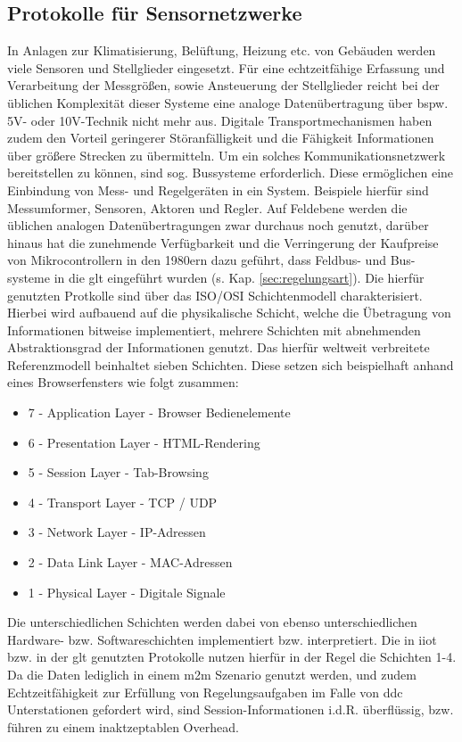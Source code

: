 \subsection{Protokolle für Sensornetzwerke}
In Anlagen zur Klimatisierung, Belüftung, Heizung etc. von Gebäuden werden viele Sensoren und Stellglieder eingesetzt. Für eine echtzeitfähige Erfassung und Verarbeitung der Messgrößen, sowie Ansteuerung der Stellglieder reicht bei der üblichen Komplexität dieser Systeme eine analoge Datenübertragung über bspw. 5V- oder 10V-Technik nicht mehr aus. Digitale Transportmechanismen haben zudem den Vorteil geringerer Störanfälligkeit und die Fähigkeit Informationen über größere Strecken zu übermitteln. \cite{gebauto}
Um ein solches Kommunikationsnetzwerk bereitstellen zu können, sind sog. Bussysteme erforderlich. Diese ermöglichen eine Einbindung von Mess- und Regelgeräten in ein System. Beispiele hierfür sind Messumformer, Sensoren, Aktoren und Regler. \cite{61158-1} \newline
Auf Feldebene werden die üblichen analogen Datenübertragungen zwar durchaus noch genutzt, darüber hinaus hat die zunehmende Verfügbarkeit und die Verringerung der Kaufpreise von Mikrocontrollern in den 1980ern dazu geführt, dass Feldbus- und Bus-systeme in die \ac{glt} eingeführt wurden (s. Kap. \ref{sec:regelungsart}).
Die hierfür genutzten Protkolle sind über das ISO/OSI Schichtenmodell charakterisiert. Hierbei wird aufbauend auf die physikalische Schicht, welche die Übetragung von Informationen bitweise implementiert, mehrere Schichten mit abnehmenden Abstraktionsgrad der Informationen genutzt. Das hierfür weltweit verbreitete Referenzmodell beinhaltet sieben Schichten. \cite{osi} Diese setzen sich beispielhaft anhand eines Browserfensters wie folgt zusammen:
\begin{itemize}
    \item 7 - Application Layer      -   Browser Bedienelemente
    \item 6 - Presentation Layer     -   HTML-Rendering
    \item 5 - Session Layer          -  Tab-Browsing
    \item 4 - Transport Layer        -   TCP / UDP
    \item 3 - Network Layer          -   IP-Adressen
    \item 2 - Data Link Layer        -   MAC-Adressen
    \item 1 - Physical Layer         -   Digitale Signale
\end{itemize}
Die unterschiedlichen Schichten werden dabei von ebenso unterschiedlichen Hardware- bzw. Softwareschichten implementiert bzw. interpretiert.
Die in \ac{iiot} bzw. in der \ac{glt} genutzten Protokolle nutzen hierfür in der Regel die Schichten 1-4. Da die Daten lediglich in einem \ac{m2m} Szenario genutzt werden, und zudem Echtzeitfähigkeit zur Erfüllung von Regelungsaufgaben im Falle von \ac{ddc} Unterstationen gefordert wird, sind Session-Informationen i.d.R. überflüssig, bzw. führen zu einem inaktzeptablen Overhead.
